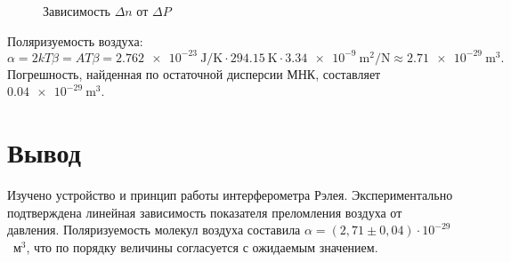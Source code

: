 \documentclass[14pt,a4paper]{extarticle}
\begin{document}
\begin{figure}[htbp]
\centering
{}
\caption{Зависимость $\Delta n$ от $\Delta P$}
\label{fig:dn}
\end{figure}

Поляризуемость воздуха:
\[
\alpha = 2kT\beta = A T \beta = \SI{2,762e-23}{\joule\per\kelvin} \cdot \SI{294,15}{\kelvin} \cdot \SI{3,34e-9}{\square\metre\per\newton} \approx \SI{2,71e-29}{\cubic\metre}.
\]
Погрешность, найденная по остаточной дисперсии МНК, составляет $\SI{0,04e-29}{\cubic\metre}$.

\section*{Вывод}

Изучено устройство и принцип работы интерферометра Рэлея. Экспериментально подтверждена линейная зависимость показателя преломления воздуха от давления. Поляризуемость молекул воздуха составила $\alpha = (2{,}71 \pm 0{,}04)\cdot 10^{-29}$~м$^3$, что по порядку величины согласуется с ожидаемым значением.
\end{document}
